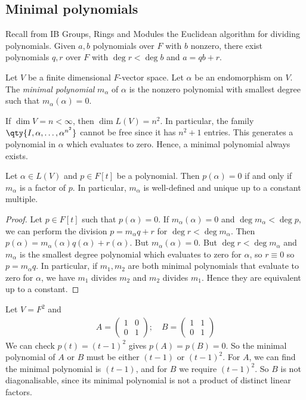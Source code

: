 \subsection{Minimal polynomials}
Recall from IB Groups, Rings and Modules the Euclidean algorithm for dividing polynomials.
Given $a, b$ polynomials over $F$ with $b$ nonzero, there exist polynomials $q, r$ over $F$ with $\deg r < \deg b$ and $a = qb + r$.
\begin{definition}
	Let $V$ be a finite dimensional $F$-vector space.
	Let $\alpha$ be an endomorphism on $V$.
	The \textit{minimal polynomial} $m_\alpha$ of $\alpha$ is the nonzero polynomial with smallest degree such that $m_\alpha(\alpha) = 0$.
\end{definition}
\begin{remark}
	If $\dim V = n < \infty$, then $\dim L(V) = n^2$.
	In particular, the family $\qty{I, \alpha, \dots, \alpha^{n^2}}$ cannot be free since it has $n^2+1$ entries.
	This generates a polynomial in $\alpha$ which evaluates to zero.
	Hence, a minimal polynomial always exists.
\end{remark}
\begin{lemma}
	Let $\alpha \in L(V)$ and $p \in F[t]$ be a polynomial.
	Then $p(\alpha) = 0$ if and only if $m_\alpha$ is a factor of $p$.
	In particular, $m_\alpha$ is well-defined and unique up to a constant multiple.
\end{lemma}
\begin{proof}
	Let $p \in F[t]$ such that $p(\alpha) = 0$.
	If $m_\alpha(\alpha) = 0$ and $\deg m_\alpha < \deg p$, we can perform the division $p = m_\alpha q + r$ for $\deg r < \deg m_\alpha$.
	Then $p(\alpha) = m_\alpha(\alpha) q(\alpha) + r(\alpha)$.
	But $m_\alpha(\alpha) = 0$.
	But $\deg r < \deg m_\alpha$ and $m_\alpha$ is the smallest degree polynomial which evaluates to zero for $\alpha$, so $r \equiv 0$ so $p = m_\alpha q$.
	In particular, if $m_1, m_2$ are both minimal polynomials that evaluate to zero for $\alpha$, we have $m_1$ divides $m_2$ and $m_2$ divides $m_1$.
	Hence they are equivalent up to a constant.
\end{proof}
\begin{example}
	Let $V = F^2$ and
	\begin{align*}
		A= \begin{pmatrix}
			1 & 0 \\
			0 & 1
		\end{pmatrix};\quad B = \begin{pmatrix}
			1 & 1 \\
			0 & 1
		\end{pmatrix}
	\end{align*}
	We can check $p(t) = (t-1)^2$ gives $p(A) = p(B) = 0$.
	So the minimal polynomial of $A$ or $B$ must be either $(t-1)$ or $(t-1)^2$.
	For $A$, we can find the minimal polynomial is $(t-1)$, and for $B$ we require $(t-1)^2$.
	So $B$ is not diagonalisable, since its minimal polynomial is not a product of distinct linear factors.
\end{example}

